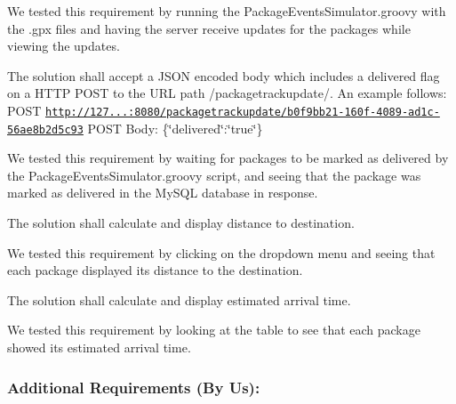 \begin{DoxyEnumerate}
\begin{DoxyItemize}
\item We tested this requirement by running the {\ttfamily Package\+Events\+Simulator.\+groovy} with the .gpx files and having the server receive updates for the packages while viewing the updates.
\end{DoxyItemize}
\item The solution shall accept a J\+S\+ON encoded body which includes a delivered flag on a H\+T\+TP P\+O\+ST to the U\+RL path {\ttfamily /packagetrackupdate/}. An example follows\+: {\ttfamily P\+O\+ST \href{http://127.0.0.1:8080/packagetrackupdate/b0f9bb21-160f-4089-ad1c-56ae8b2d5c93}{\tt http\+://127...\+:8080/packagetrackupdate/b0f9bb21-\/160f-\/4089-\/ad1c-\/56ae8b2d5c93}} {\ttfamily P\+O\+ST Body\+: \{\char`\"{}delivered\char`\"{}\+:\char`\"{}true\char`\"{}\}}
\begin{DoxyItemize}
\item We tested this requirement by waiting for packages to be marked as delivered by the {\ttfamily Package\+Events\+Simulator.\+groovy} script, and seeing that the package was marked as delivered in the My\+S\+QL database in response.
\end{DoxyItemize}
\item The solution shall calculate and display distance to destination.
\begin{DoxyItemize}
\item We tested this requirement by clicking on the dropdown menu and seeing that each package displayed its distance to the destination.
\end{DoxyItemize}
\item The solution shall calculate and display estimated arrival time.
\begin{DoxyItemize}
\item We tested this requirement by looking at the table to see that each package showed its estimated arrival time.
\end{DoxyItemize}
\end{DoxyEnumerate}

\subsubsection*{Additional Requirements (By Us)\+:}



